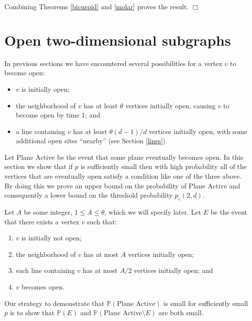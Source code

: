 \documentclass{amsart}
\newcommand{\prob}{\mathbb{P}}
\newcommand{\D}{\text{Plane Active}}
\newcommand{\threshold}{\theta}
\newcommand{\noodle}{r}
\numberwithin{equation}{section}
\theoremstyle{definition}
\theoremstyle{remark}
\newenvironment{pfofthm}[1]
{\par\vskip2\parsep\noindent{\sc Proof of\ #1. }}{{\hfill
$\Box$}
\par\vskip2\parsep}
\begin{document}
\begin{pfofthm}{Theorem \ref{la liga}}
Combining Theorems \ref{bicuspid} and \ref{molar} proves the result. 
\end{pfofthm}


\section{Open two-dimensional subgraphs} \label{nessforplanes}
In previous sections we have encountered several possibilities
for a vertex $v$ to become open:
\begin{itemize}
\item $v$ is initially open;
\item the neighborhood of $v$ has at least $\threshold$ vertices initially open, causing $v$ to become open by time 1; and 
\item a line containing $v$ has at least $\threshold(d-1)/d$ vertices initially open, 
with some additional open sites ``nearby'' (see Section 
\ref{lines}).
\end{itemize}

Let $\D$ be the event that some plane eventually becomes open.
In this section we show that if $p$ is sufficiently small then with high probability all of the vertices that are eventually open satisfy a condition like one of the three above.
By doing this we prove an upper bound on the 
probability of $\D$ and consequently a lower bound on the threshold probability $p_c(2,d)$.  


Let $A$ be some integer, $1\leq A\leq \threshold$, which we will specify later. Let $E$ be the event that there exists a vertex $v$ such that:
\begin{enumerate}
\item $v$ is initially not open; \label{aretha}
\item the neighborhood of $v$ has at most $A$ vertices initially open; \label{thebigo}
\item each line containing $v$ has at most $A/2$ vertices initially open; and \label{wilsonpickett}
\item $v$ becomes open. \label{samcooke}
\end{enumerate}
Our strategy to demonstrate that $\prob(\D)$ is small for sufficiently small $p$ is to  
show that  $\prob(E)$ and $\prob(\D \setminus E)$ are both small.
\end{document}
